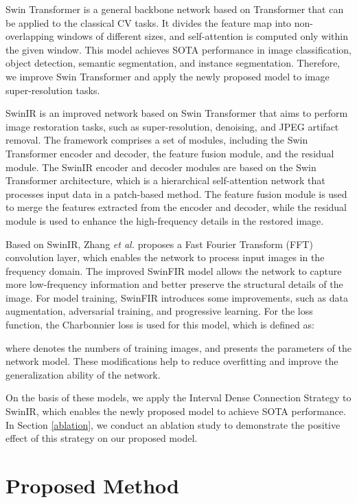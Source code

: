 \documentclass[default,iicol]{sn-jnl}
\theoremstyle{thmstyleone}\newtheorem{theorem}{Theorem}\newtheorem{proposition}[theorem]{Proposition}
\theoremstyle{thmstyletwo}\newtheorem{example}{Example}\newtheorem{remark}{Remark}\theoremstyle{thmstylethree}\newtheorem{definition}{Definition}
\begin{document}
Swin Transformer \cite{liu2021swin} is a general backbone network based on Transformer that can be applied to the classical CV tasks. It divides the feature map into non-overlapping windows of different sizes, and self-attention is computed only within the given window. This model achieves SOTA performance in image classification, object detection, semantic segmentation, and instance segmentation. Therefore, we improve Swin Transformer and apply the newly proposed model to image super-resolution tasks.

SwinIR \cite{liang2021swinir} is an improved network based on Swin Transformer that aims to perform image restoration tasks, such as super-resolution, denoising, and JPEG artifact removal. The framework comprises a set of modules, including the Swin Transformer encoder and decoder, the feature fusion module, and the residual module. The SwinIR encoder and decoder modules are based on the Swin Transformer architecture, which is a hierarchical self-attention network that processes input data in a patch-based method. The feature fusion module is used to merge the features extracted from the encoder and decoder, while the residual module is used to enhance the high-frequency details in the restored image.

Based on SwinIR, Zhang \emph{et al.} \cite{zhang2022swinfir} proposes a Fast Fourier Transform (FFT) convolution layer, which enables the network to process input images in the frequency domain. The improved SwinFIR model allows the network to capture more low-frequency information and better preserve the structural details of the image. For model training, SwinFIR introduces some improvements, such as data augmentation, adversarial training, and progressive learning. For the loss function, the Charbonnier loss \cite{lai2018fast} is used for this model, which is defined as:

 
where  denotes the numbers of training images, and  presents the parameters of the network model. These modifications help to reduce overfitting and improve the generalization ability of the network.

On the basis of these models, we apply the Interval Dense Connection Strategy to SwinIR, which enables the newly proposed model to achieve SOTA performance. In Section \ref{ablation}, we conduct an ablation study to demonstrate the positive effect of this strategy on our proposed model.

\section{Proposed Method}
\label{method}
\end{document}

